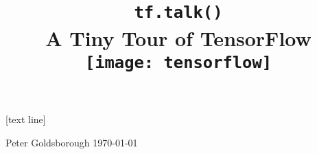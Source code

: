 
{
[text line]{%
  \parbox{\linewidth}{%
    \vspace*{-20pt}%
    \footnotesize Peter Goldsborough\hspace{5.2cm} {\today}}%
}

\begin{frame}
    \title{
      \vspace{1.6cm}\\
      {\Huge \texttt{tf.talk()}}\\
      \vspace{0.75cm}
      A Tiny Tour of TensorFlow\\
      \vspace{0.75cm}
      \texttt{[image: tensorflow]}}
      \date{}
    \titlepage
\end{frame}
}

\addtocounter{framenumber}{-1}
